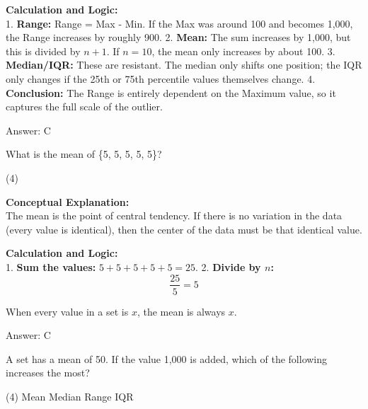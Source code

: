 \documentclass[11pt,paper=a4,answers]{exam}
\begin{document}
\begin{questions}
\begin{solution}
\vspace{30pt}

\textbf{Calculation and Logic:} \\
1. \textbf{Range:} Range = Max - Min. If the Max was around 100 and becomes 1,000, the Range increases by roughly 900.
2. \textbf{Mean:} The sum increases by 1,000, but this is divided by $n+1$. If $n=10$, the mean only increases by about 100.
3. \textbf{Median/IQR:} These are resistant. The median only shifts one position; the IQR only changes if the 25th or 75th percentile values themselves change.
4. \textbf{Conclusion:} The Range is entirely dependent on the Maximum value, so it captures the full scale of the outlier.

\vspace{30pt}

Answer: \colorbox{yellow!100}{C}
\end{solution}

\vspace{60pt}

\question
What is the mean of \{5, 5, 5, 5, 5\}?
\begin{tasks}(4)
\end{tasks}

\begin{solution}
\textbf{Conceptual Explanation:} \\
The mean is the point of central tendency. If there is no variation in the data (every value is identical), then the center of the data must be that identical value.

\vspace{30pt}

\textbf{Calculation and Logic:} \\
1. \textbf{Sum the values:} $5 + 5 + 5 + 5 + 5 = 25$.
2. \textbf{Divide by $n$:} 
\[ \frac{25}{5} = 5 \]

\vspace{20pt}

When every value in a set is $x$, the mean is always $x$.

\vspace{30pt}

Answer: \colorbox{yellow!100}{C}
\end{solution}


\question
A set has a mean of 50. If the value 1,000 is added, which of the following increases the most?
\begin{tasks}(4)
    \task Mean
    \task Median
    \task Range
    \task IQR
\end{tasks}


\end{questions}
\end{document}
